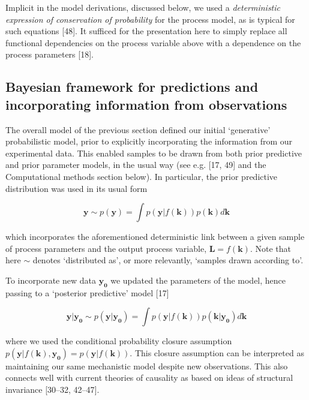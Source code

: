 \documentclass[10pt,letterpaper]{article}
\begin{document}
Implicit in the model derivations, discussed below, we used a
\emph{deterministic expression of conservation of probability} for the
process model, as is typical for such equations {[}48{]}. It sufficed
for the presentation here to simply replace all functional dependencies
on the process variable above with a dependence on the process
parameters {[}18{]}.

\subsection{Bayesian framework for predictions and incorporating
information from
observations}\label{bayesian-framework-for-predictions-and-incorporating-information-from-observations}

The overall model of the previous section defined our initial
`generative' probabilistic model, prior to explicitly incorporating the
information from our experimental data. This enabled samples to be drawn
from both prior predictive and prior parameter models, in the usual way
(see e.g. {[}17, 49{]} and the Computational methods section below). In
particular, the prior predictive distribution was used in its usual form

\begin{equation}\mathbf{y} \sim p(\mathbf{y}) = \int p(\mathbf{y}|f(\mathbf{k}))p(\mathbf{k})d\mathbf{k}\label{eq:prior-predictive}\end{equation}

which incorporates the aforementioned deterministic link between a given
sample of process parameters and the output process variable,
\(\mathbf{L}=f(\mathbf{k})\). Note that here \(\sim\) denotes
`distributed as', or more relevantly, `samples drawn according to'.

To incorporate new data \(\mathbf{y_0}\) we updated the parameters of
the model, hence passing to a `posterior predictive' model {[}17{]}

\begin{equation}\mathbf{y} | \mathbf{y_0} \sim p(\mathbf{y}|\mathbf{y_0}) = \int p(\mathbf{y}|f(\mathbf{k}))p(\mathbf{k}|\mathbf{y_0})d\mathbf{k}\label{eq:posterior-predictive}\end{equation}

where we used the conditional probability closure assumption
\(p(\mathbf{y}|f(\mathbf{k}),\mathbf{y_0}) = p(\mathbf{y}|f(\mathbf{k}))\).
This closure assumption can be interpreted as maintaining our same
mechanistic model despite new observations. This also connects well with
current theories of causality as based on ideas of structural invariance
{[}30--32, 42--47{]}.
\end{document}
